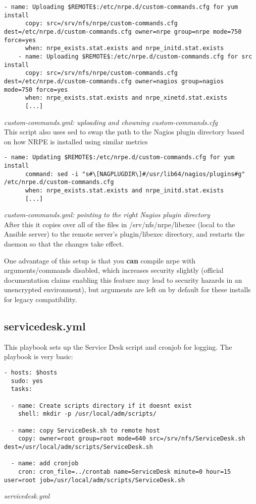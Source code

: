 \documentclass[a4paper]{article}
\begin{document}
\begin{lstlisting}[language=nagconf]
    - name: Uploading $REMOTE$:/etc/nrpe.d/custom-commands.cfg for yum install
      copy: src=/srv/nfs/nrpe/custom-commands.cfg dest=/etc/nrpe.d/custom-commands.cfg owner=nrpe group=nrpe mode=750 force=yes
      when: nrpe_exists.stat.exists and nrpe_initd.stat.exists
    - name: Uploading $REMOTE$:/etc/nrpe.d/custom-commands.cfg for src install
      copy: src=/srv/nfs/nrpe/custom-commands.cfg dest=/etc/nrpe.d/custom-commands.cfg owner=nagios group=nagios mode=750 force=yes
      when: nrpe_exists.stat.exists and nrpe_xinetd.stat.exists
      [...]
\end{lstlisting}
\hfill \textit{custom-commands.yml: uploading and chowning custom-commands.cfg}\\

This script also uses sed to swap the path to the Nagios plugin directory based on how NRPE is installed using similar metrics

\begin{lstlisting}[language=nagconf]
    - name: Updating $REMOTE$:/etc/nrpe.d/custom-commands.cfg for yum install
      command: sed -i "s#\[NAGPLUGDIR\]#/usr/lib64/nagios/plugins#g" /etc/nrpe.d/custom-commands.cfg
      when: nrpe_exists.stat.exists and nrpe_initd.stat.exists
      [...]
\end{lstlisting}
\hfill \textit{custom-commands.yml: pointing to the right Nagios plugin directory}\\

After this it copies over all of the files in /srv/nfs/nrpe/libexec (local to the Ansible server) to the remote server's plugin/libexec directory, and restarts the daemon so that the changes take effect.

One advantage of this setup is that you \textbf{can} compile nrpe with arguments/commands disabled, which increases security slightly (official documentation claims enabling this feature may lead to security hazards in an unencrypted environment), but arguments are left on by default for these installs for legacy compatibility.

\subsection{servicedesk.yml}

This playbook sets up the Service Desk script and cronjob for logging. The playbook is very basic:

\begin{lstlisting}[language=nagconf]
- hosts: $hosts
  sudo: yes
  tasks:

  - name: Create scripts directory if it doesnt exist
    shell: mkdir -p /usr/local/adm/scripts/

  - name: copy ServiceDesk.sh to remote host
    copy: owner=root group=root mode=640 src=/srv/nfs/ServiceDesk.sh dest=/usr/local/adm/scripts/ServiceDesk.sh

  - name: add cronjob
    cron: cron_file=../crontab name=ServiceDesk minute=0 hour=15 user=root job=/usr/local/adm/scripts/ServiceDesk.sh
\end{lstlisting}
\hfill \textit{servicedesk.yml}\\
\end{document}

